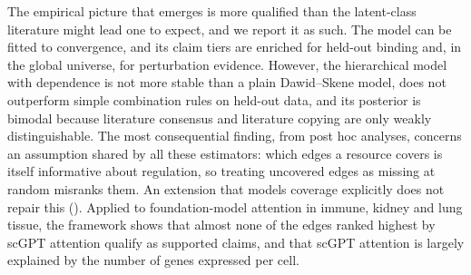 The empirical picture that emerges is more qualified than the latent-class literature might lead one to expect, and we report it as such.
The model can be fitted to convergence, and its claim tiers are enriched for held-out binding and, in the global universe, for perturbation evidence.
However, the hierarchical model with dependence is not more stable than a plain Dawid--Skene model, does not outperform simple combination rules on held-out data, and its posterior is bimodal because literature consensus and literature copying are only weakly distinguishable.
The most consequential finding, from post hoc analyses, concerns an assumption shared by all these estimators: which edges a resource covers is itself informative about regulation, so treating uncovered edges as missing at random misranks them.
An extension that models coverage explicitly does not repair this ().
Applied to foundation-model attention in immune, kidney and lung tissue, the framework shows that almost none of the edges ranked highest by scGPT attention qualify as supported claims, and that scGPT attention is largely explained by the number of genes expressed per cell.



